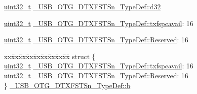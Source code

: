 \begin{DoxyCompactItemize}
\begin{tabbing}
\end{tabbing}\item 
\hyperlink{stdint_8h_a435d1572bf3f880d55459d9805097f62}{uint32\-\_\-t} \hyperlink{group___u_s_b___o_t_g___d_r_i_v_e_r_ga4862ebb577ee8e26382e28909ab0c275}{\-\_\-\-U\-S\-B\-\_\-\-O\-T\-G\-\_\-\-D\-T\-X\-F\-S\-T\-Sn\-\_\-\-Type\-Def\-::d32}
\item 
\hyperlink{stdint_8h_a435d1572bf3f880d55459d9805097f62}{uint32\-\_\-t} \hyperlink{group___u_s_b___o_t_g___d_r_i_v_e_r_ga8c5fd712fbdfea0b80c533af69d25f33}{\-\_\-\-U\-S\-B\-\_\-\-O\-T\-G\-\_\-\-D\-T\-X\-F\-S\-T\-Sn\-\_\-\-Type\-Def\-::txfspcavail}\-: 16
\item 
\hyperlink{stdint_8h_a435d1572bf3f880d55459d9805097f62}{uint32\-\_\-t} \hyperlink{group___u_s_b___o_t_g___d_r_i_v_e_r_gac897a0ce4a1b6cdba39c3fcf36948dc8}{\-\_\-\-U\-S\-B\-\_\-\-O\-T\-G\-\_\-\-D\-T\-X\-F\-S\-T\-Sn\-\_\-\-Type\-Def\-::\-Reserved}\-: 16
\item 
\begin{tabbing}
xx\=xx\=xx\=xx\=xx\=xx\=xx\=xx\=xx\=\kill
struct \{\\
\>\hyperlink{stdint_8h_a435d1572bf3f880d55459d9805097f62}{uint32\_t} \hyperlink{group___u_s_b___o_t_g___d_r_i_v_e_r_ga8c5fd712fbdfea0b80c533af69d25f33}{\_USB\_OTG\_DTXFSTSn\_TypeDef::txfspcavail}: 16\\
\>\hyperlink{stdint_8h_a435d1572bf3f880d55459d9805097f62}{uint32\_t} \hyperlink{group___u_s_b___o_t_g___d_r_i_v_e_r_gac897a0ce4a1b6cdba39c3fcf36948dc8}{\_USB\_OTG\_DTXFSTSn\_TypeDef::Reserved}: 16\\
\} \hyperlink{group___u_s_b___o_t_g___d_r_i_v_e_r_ga72a3d9f86c27e387f27aaa1b1b5dc7cb}{\_USB\_OTG\_DTXFSTSn\_TypeDef::b}\\


\end{tabbing}
\end{DoxyCompactItemize}
